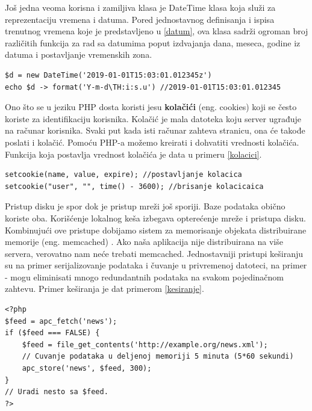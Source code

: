 \documentclass[a4paper]{article}
\begin{document}
{Još jedna veoma korisna i zamiljiva klasa je DateTime klasa \cite{PHPtheGoodParts, phpSrbija} koja služi za reprezentaciju vremena i datuma. Pored jednostavnog definisanja i ispisa trenutnog vremena koje je predstavljeno u \ref{datum}, ova klasa sadrži ogroman broj različitih funkcija za rad sa datumima poput izdvajanja dana, meseca, godine iz datuma i postavljanje vremenskih zona. 

\begin{lstlisting}[caption={Primer upotrebe klase DateTime},frame=single, label=datum]
$d = new DateTime('2019-01-01T15:03:01.012345z')
echo $d -> format('Y-m-d\TH:i:s.u') //2019-01-01T15:03:01.012345
\end{lstlisting}

Ono što se u jeziku PHP dosta koristi jesu \textbf{kolačići} (eng. cookies)\cite{PHPtheGoodParts, phpSrbija} koji se često koriste za identifikaciju korisnika. Kolačić je mala datoteka koju server ugrađuje na računar korisnika. Svaki put kada isti računar zahteva stranicu, ona će takođe poslati i kolačić. Pomoću PHP-a možemo kreirati i dohvatiti vrednosti kolačića. Funkcija koja postavlja vrednost kolačića je data u primeru \ref{kolacici}.

\begin{lstlisting}[caption={Funkcija za postavljanje kolacica},frame=single, label=kolacici]
setcookie(name, value, expire); //postavljanje kolacica
setcookie("user", "", time() - 3600); //brisanje kolacicaica
\end{lstlisting}

Pristup disku je spor dok je pristup mreži još sporiji. Baze podataka obično koriste oba. Korišćenje lokalnog keša izbegava opterećenje mreže i pristupa disku. Kombinujući ove pristupe dobijamo sistem za memorisanje objekata distribuirane memorije (eng. memcached) \cite{tips}. Ako naša aplikacija nije distribuirana na više servera, verovatno nam neće trebati memcached. Jednostavniji pristupi keširanju su na primer serijalizovanje podataka i čuvanje u privremenoj datoteci, na primer - mogu eliminisati mnogo redundantnih podataka na svakom pojedinačnom zahtevu\cite{phpSrbija}. Primer keširanja je dat primerom \ref{kesiranje}.

\begin{lstlisting}[caption={Primer keširanja},frame=single, label=kesiranje]
<?php
$feed = apc_fetch('news');
if ($feed === FALSE) {
    $feed = file_get_contents('http://example.org/news.xml');
    // Cuvanje podataka u deljenoj memoriji 5 minuta (5*60 sekundi)
    apc_store('news', $feed, 300);
}
// Uradi nesto sa $feed.
?> 
\end{lstlisting}




}
\end{document}

